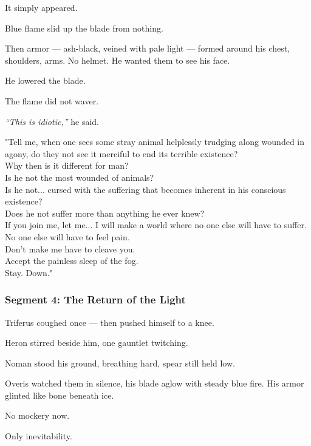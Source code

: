 \documentclass[9pt]{article}
\begin{document}
It simply appeared.

Blue flame slid up the blade from nothing.

Then armor — ash-black, veined with pale light — formed around his chest, shoulders, arms. No helmet. He wanted them to see his face.

He lowered the blade.

The flame did not waver.

\textit{“This is idiotic,”} he said.

"Tell me, when one sees some stray animal helplessly trudging along wounded in agony, do they not see it merciful to end its terrible existence?\\

Why then is it different for man?\\

Is he not the most wounded of animals?\\

Is he not... cursed with the suffering that becomes inherent in his conscious existence?\\

Does he not suffer more than anything he ever knew?\\

If you join me, let me... I will make a world where no one else will have to suffer. No one else will have to feel pain.\\

Don't make me have to cleave you.\\

Accept the painless sleep of the fog.\\

Stay. Down."

\newpage

\subsubsection*{Segment 4: The Return of the Light}
Triferus coughed once — then pushed himself to a knee.

Heron stirred beside him, one gauntlet twitching.

Noman stood his ground, breathing hard, spear still held low.

Overis watched them in silence, his blade aglow with steady blue fire. His armor glinted like bone beneath ice.

No mockery now.

Only inevitability.
\end{document}
